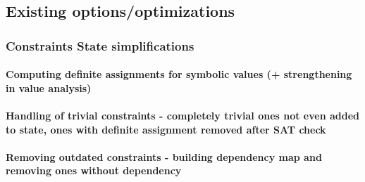 \subsection{Existing options/optimizations}
\subsubsection{Constraints State simplifications}
\paragraph{Computing definite assignments for symbolic values (+ strengthening in value analysis)}
\paragraph{Handling of trivial constraints - completely trivial ones not even added to state, ones with definite assignment removed after SAT check}
\paragraph{Removing outdated constraints - building dependency map and removing ones without dependency}
